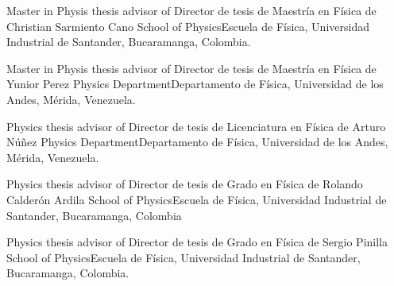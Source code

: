 \ifeng
Master in Physis thesis advisor of
\else
Director de tesis de Maestría en Física de
\fi
Christian Sarmiento Cano \at \ifeng School of Physics\else Escuela de Física\fi, Universidad Industrial de Santander, Bucaramanga, Colombia.

\ifeng
Master in Physis thesis advisor of
\else
Director de tesis de Maestría en Física de
\fi
Yunior Perez \at \ifeng Physics Department\else Departamento de Física\fi, Universidad de los Andes, Mérida, Venezuela. 

\ifeng
Physics thesis advisor of
\else
Director de tesis de Licenciatura en Física de
\fi
Arturo Núñez \at \ifeng Physics Department\else Departamento de Física\fi, Universidad de los Andes, Mérida, Venezuela. 

\ifeng
Physics thesis advisor of
\else
Director de tesis de Grado en Física de
\fi
Rolando Calderón Ardila \at  \ifeng School of Physics\else Escuela de Física\fi, Universidad Industrial de Santander, Bucaramanga, Colombia 

\ifeng
Physics thesis advisor of
\else
Director de tesis de Grado en Física de
\fi
Sergio Pinilla \at \ifeng School of Physics\else Escuela de Física\fi, Universidad Industrial de Santander, Bucaramanga, Colombia.

